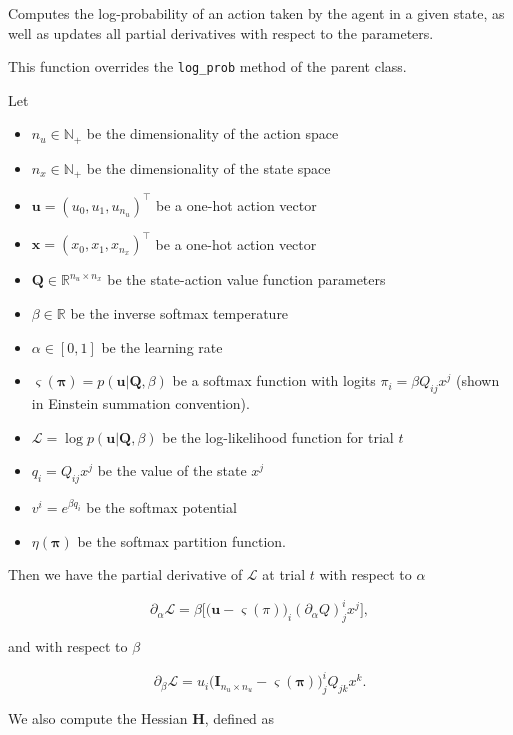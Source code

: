 Computes the log-probability of an action taken by the agent in a given
state, as well as updates all partial derivatives with respect to the
parameters.

This function overrides the \texttt{log\_prob} method of the parent
class.

Let

\begin{itemize}
\tightlist
\item
  \(n_u \in \mathbb N_+\) be the dimensionality of the action space
\item
  \(n_x \in \mathbb N_+\) be the dimensionality of the state space
\item
  \(\mathbf u = (u_0, u_1, u_{n_u})^\top\) be a one-hot action vector
\item
  \(\mathbf x = (x_0, x_1, x_{n_x})^\top\) be a one-hot action vector
\item
  \(\mathbf Q \in \mathbb R^{n_u \times n_x}\) be the state-action value
  function parameters
\item
  \(\beta \in \mathbb R\) be the inverse softmax temperature
\item
  \(\alpha \in [0, 1]\) be the learning rate
\item
  \(\varsigma(\boldsymbol\pi) = p(\mathbf u | \mathbf Q, \beta)\) be a
  softmax function with logits \(\pi_i = \beta Q_{ij} x^j\) (shown in
  Einstein summation convention).
\item
  \(\mathcal L = \log p(\mathbf u | \mathbf Q, \beta)\) be the
  log-likelihood function for trial \(t\)
\item
  \(q_i = Q_{ij} x^j\) be the value of the state \(x^j\)
\item
  \(v^i = e^{\beta q_i}\) be the softmax potential
\item
  \(\eta(\boldsymbol\pi)\) be the softmax partition function.
\end{itemize}

Then we have the partial derivative of \(\mathcal L\) at trial \(t\)
with respect to \(\alpha\)

\[
\partial_{\alpha} \mathcal L = \beta \Big[ \big(\mathbf u - \varsigma(\pi)\big)_i (\partial_{\alpha} Q)^i_j x^j \Big],
\]

and with respect to \(\beta\)

\[
\partial_{\beta} \mathcal L = u_i \Big(\mathbf I_{n_u \times n_u} - \varsigma(\boldsymbol\pi)\Big)^i_j Q_{jk} x^k.
\]

We also compute the Hessian \(\mathbf H\), defined as

